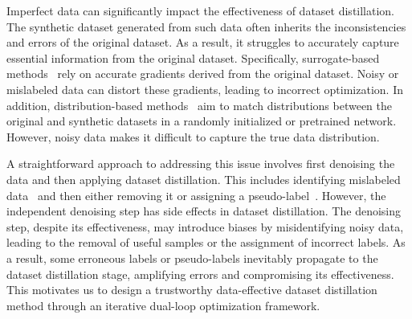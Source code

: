 Imperfect data can significantly impact the effectiveness of dataset distillation.
The synthetic dataset generated from such data often inherits the inconsistencies and errors of the original dataset. 
As a result, it struggles to accurately capture essential information from the original dataset.
Specifically, surrogate-based methods~\cite{zhao2021datasetcondensation, zhao2021dataset, du2023minimizing, guo2024lossless, liu2024dataset} rely on accurate gradients derived from the original dataset.
Noisy or mislabeled data can distort these gradients, leading to incorrect optimization.
In addition, distribution-based methods~\cite{sajedi2023datadam, zhao2023improved, yin2023sre2l, sun2024rded} aim to match distributions between the original and synthetic datasets in a randomly initialized or pretrained network.
However, noisy data makes it difficult to capture the true data distribution.


A straightforward approach to addressing this issue involves first denoising the data and then applying dataset distillation.
This includes identifying mislabeled data~\cite{han2018co, li2020dividemix, albert2022addressing, northcutt2021confident} and then either removing it or assigning a pseudo-label~\cite{tanaka2018joint, yi2019probabilistic}.
However, the independent denoising step has side effects in dataset distillation.
The denoising step, despite its effectiveness, may introduce biases by misidentifying noisy data, leading to the removal of useful samples or the assignment of incorrect labels. 
As a result, some erroneous labels or pseudo-labels inevitably propagate to the dataset distillation stage, amplifying errors and compromising its effectiveness.
This motivates us to design a trustworthy data-effective dataset distillation method through an iterative dual-loop optimization framework.

